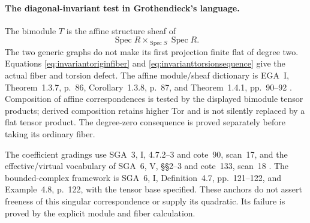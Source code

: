 \paragraph{The diagonal-invariant test in Grothendieck's language.}
The bimodule \(T\) is the affine structure sheaf of
\[
 \operatorname{Spec}R
       \times_{\operatorname{Spec}S}
 \operatorname{Spec}R.
\]
The two generic graphs do not make its first projection
finite flat of degree two. Equations
\eqref{eq:invariantoriginfiber} and
\eqref{eq:invarianttorsionsequence} give the actual fiber
and torsion defect. The affine module/sheaf dictionary is
EGA~I, Theorem~1.3.7, p.~86, Corollary~1.3.8, p.~87, and
Theorem~1.4.1, pp.~90--92 \cite{EGA}.
Composition of affine correspondences is tested by the
displayed bimodule tensor products; derived composition
retains higher Tor and is not silently replaced by a
flat tensor product. The degree-zero consequence is
proved separately before taking its ordinary fiber.

The coefficient gradings use SGA~3, I, 4.7.2--3 and
cote~90, scan~17, and the effective/virtual vocabulary of
SGA~6, V, \S\S2--3 and cote~133, scan~18
\cite{SGA3,SGA6,Archive}. The bounded-complex framework is
SGA~6, I, Definition~4.7, pp.~121--122, and
Example~4.8, p.~122, with the tensor base specified.
These anchors do not assert freeness of this singular
correspondence or supply its quadratic. Its failure is
proved by the explicit module and fiber calculation.

